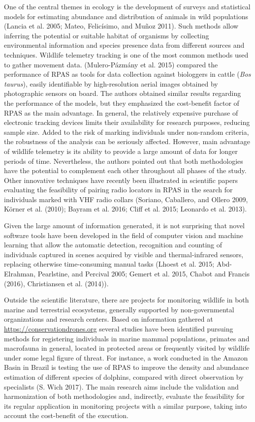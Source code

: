 \documentclass[]{interact}
\theoremstyle{plain}%
\theoremstyle{definition}
\theoremstyle{remark}
\begin{document}
One of the central themes in ecology is the development of surveys and
statistical models for estimating abundance and distribution of animals
in wild populations (Lancia et al. 2005; Mateo, Felicísimo, and Muñoz
2011). Such methods allow inferring the potential or suitable habitat of
organisms by collecting environmental information and species presence
data from different sources and techniques. Wildlife telemetry tracking
is one of the most common methods used to gather movement data.
(Mulero-Pázmány et al. 2015) compared the performance of RPAS as tools
for data collection against biologgers in cattle (\emph{Bos taurus}),
easily identifiable by high-resolution aerial images obtained by
photographic sensors on board. The authors obtained similar results
regarding the performance of the models, but they emphasized the
cost-benefit factor of RPAS as the main advantage. In general, the
relatively expensive purchase of electronic tracking devices limits
their availability for research purposes, reducing sample size. Added to
the risk of marking individuals under non-random criteria, the
robustness of the analysis can be seriously affected. However, main
advantage of wildlife telemetry is its ability to provide a large amount
of data for longer periods of time. Nevertheless, the authors pointed
out that both methodologies have the potential to complement each other
throughout all phases of the study. Other innovative techniques have
recently been illustrated in scientific papers evaluating the
feasibility of pairing radio locators in RPAS in the search for
individuals marked with VHF radio collars (Soriano, Caballero, and
Ollero 2009, Körner et al. (2010); Bayram et al. 2016; Cliff et al.
2015; Leonardo et al. 2013).

Given the large amount of information generated, it is not surprising
that novel software tools have been developed in the field of computer
vision and machine learning that allow the automatic detection,
recognition and counting of individuals captured in scenes acquired by
visible and thermal-infrared sensors, replacing otherwise time-consuming
manual tasks (Lhoest et al. 2015; Abd-Elrahman, Pearlstine, and Percival
2005; Gemert et al. 2015, Chabot and Francis (2016), Christiansen et al.
(2014)).

Outside the scientific literature, there are projects for monitoring
wildlife in both marine and terrestrial ecosystems, generally supported
by non-governmental organizations and research centers. Based on
information gathered at \url{https://conservationdrones.org} several
studies have been identified pursuing methods for registering
individuals in marine mammal populations, primates and macrofauna in
general, located in protected areas or frequently visited by wildlife
under some legal figure of threat. For instance, a work conducted in the
Amazon Basin in Brazil is testing the use of RPAS to improve the density
and abundance estimation of different species of dolphins, compared with
direct observation by specialists (S. Wich 2017). The main research aims
include the validation and harmonization of both methodologies and,
indirectly, evaluate the feasibility for its regular application in
monitoring projects with a similar purpose, taking into account the
cost-benefit of the execution.
\end{document}
